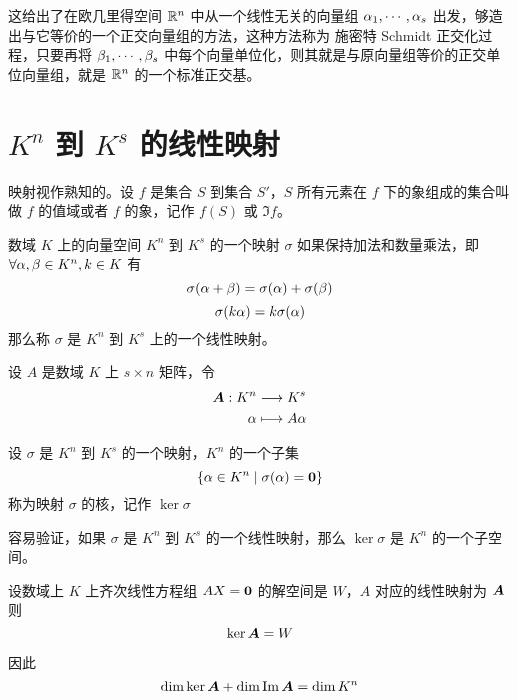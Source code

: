 这给出了在欧几里得空间 $\mathbb{R}^n$ 中从一个线性无关的向量组 $\alpha_1,\cdots,\alpha_s$ 出发，够造出与它等价的一个正交向量组的方法，这种方法称为 施密特 Schmidt 正交化过程，只要再将 $\beta_1,\cdots,\beta_s$ 中每个向量单位化，则其就是与原向量组等价的正交单位向量组，就是 $\mathbb{R}^n$ 的一个标准正交基。

\section{\texorpdfstring{$K^n$ 到 $K^s$ 的线性映射}{Kn 到 Ks 的线性映射}}

映射视作熟知的。设 $f$ 是集合 $S$ 到集合 $S'$，$S$ 所有元素在 $f$ 下的象组成的集合叫做 $f$ 的值域或者 $f$ 的象，记作 $f(S)$ 或 $\Im f$。

\begin{definition}
    数域 $K$ 上的向量空间 $K^n$ 到 $K^s$ 的一个映射 $\sigma$ 如果保持加法和数量乘法，即 $\forall \alpha,\beta \in K^n,k\in K$ 有
    \[\sigma (\alpha+\beta) = \sigma(\alpha) + \sigma(\beta)\]
    \[\sigma(k\alpha) = k\sigma(\alpha)\]
    那么称 $\sigma$ 是 $K^n$ 到 $K^s$ 上的一个线性映射。
\end{definition}

设 $A$ 是数域 $K$ 上 $s\times n$ 矩阵，令
\begin{equation*}
    \begin{aligned}
        \boldsymbol{A} : K^n &\longrightarrow K^s\\
        \alpha &\longmapsto A\alpha
    \end{aligned}
\end{equation*}


\begin{definition}
    设 $\sigma$ 是 $K^n$ 到 $K^s$ 的一个映射，$K^n$ 的一个子集
    \[\{\alpha \in K^n \mid \sigma(\alpha) = \boldsymbol{0}\}\]
    称为映射 $\sigma$ 的核，记作 $\ker \sigma$
\end{definition}

容易验证，如果 $\sigma$ 是 $K^n$ 到 $K^s$ 的一个线性映射，那么 $\ker \sigma$ 是 $K^n$ 的一个子空间。

\begin{theorem}
    设数域上 $K$ 上齐次线性方程组 $AX = \boldsymbol{0}$ 的解空间是 $W$，$A$ 对应的线性映射为 $\boldsymbol{A}$ 则
    \[\ker \boldsymbol{A} = W\]
\end{theorem}

因此
\[\dim \ker \boldsymbol{A} + \dim \operatorname{Im} \boldsymbol{A} = \dim K^n\]
